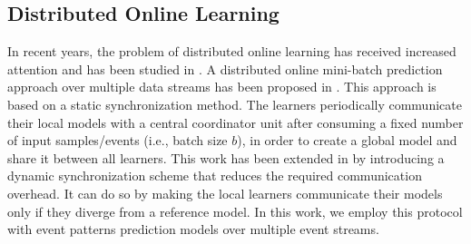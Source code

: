
\subsection{Distributed Online Learning}
\par In recent years, the problem of distributed online learning has received increased attention and has been studied in \cite{langford2009slow,yan2013distributed,xiao2010dual,dekel2012optimal,kamp2014communication}.  A distributed online mini-batch prediction approach over multiple data streams has been proposed in \cite{dekel2012optimal}. This approach is based on a static synchronization method. The learners periodically communicate  their local models with a central coordinator unit after consuming a fixed number of input samples/events (i.e., batch size $b$), in order to  create a global model and share it between all learners. This work has been extended in \cite{kamp2014communication} by introducing a
dynamic synchronization scheme that reduces the required communication overhead. It can do so by making the local learners communicate their models only if they diverge from a reference model. In this work, we employ this protocol with event patterns prediction models over multiple event streams. 

